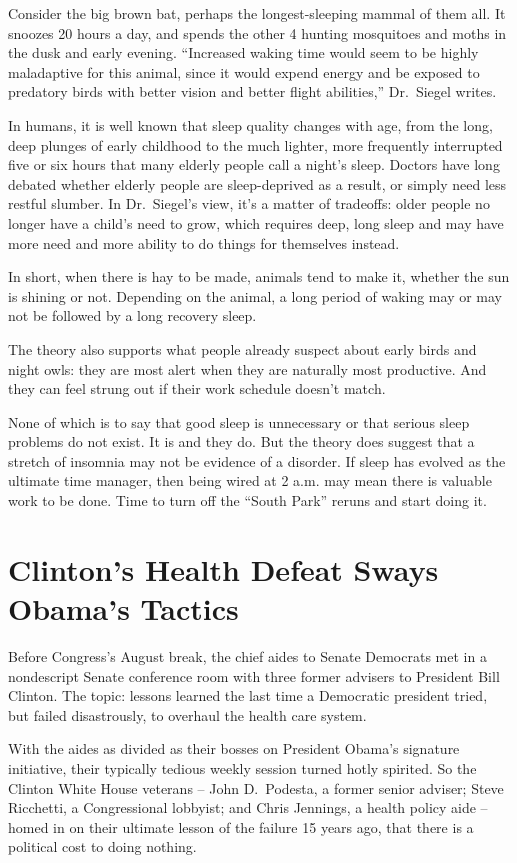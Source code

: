 ﻿\documentclass[12pt]{article}
\begin{document}
Consider the big brown bat, perhaps the longest-sleeping mammal of them all. It snoozes 20 hours a
day, and spends the other 4 hunting mosquitoes and moths in the dusk and early evening. ``Increased
waking time would seem to be highly maladaptive for this animal, since it would expend energy and be
exposed to predatory birds with better vision and better flight abilities,'' Dr.~Siegel writes.

In humans, it is well known that sleep quality changes with age, from the long, deep plunges of
early childhood to the much lighter, more frequently interrupted five or six hours that many elderly
people call a night's sleep. Doctors have long debated whether elderly people are sleep-deprived as
a result, or simply need less restful slumber\cite{slumber}. In Dr.~Siegel's view, it's a matter of
tradeoffs: older people no longer have a child's need to grow, which requires deep, long sleep and
may have more need and more ability to do things for themselves instead.

In short, when there is hay\cite{hay} to be made, animals tend to make it, whether the sun is
shining or not. Depending on the animal, a long period of waking may or may not be followed by a
long recovery sleep.

The theory also supports what people already suspect about early birds and night owls: they are most
alert when they are naturally most productive. And they can feel strung out if their work schedule
doesn't match.

None of which is to say that good sleep is unnecessary or that serious sleep problems do not exist.
It is and they do. But the theory does suggest that a stretch of insomnia may not be evidence of a
disorder. If sleep has evolved as the ultimate time manager, then being wired at 2 a.m. may mean
there is valuable work to be done. Time to turn off the ``South Park'' reruns and start doing it.

\section{Clinton's Health Defeat Sways\cite{sway} Obama's Tactics}

Before Congress's August break, the chief aides to Senate Democrats met in a nondescript Senate
conference room with three former advisers to President Bill Clinton. The topic: lessons learned the
last time a Democratic president tried, but failed disastrously, to overhaul the health care system.

With the aides as divided as their bosses on President Obama's signature initiative, their typically
tedious weekly session turned hotly spirited. So the Clinton White House veterans -- John
D.~Podesta, a former senior adviser; Steve Ricchetti, a Congressional lobbyist; and Chris Jennings,
a health policy aide -- homed in on their ultimate lesson of the failure 15 years ago, that there is
a political cost to doing nothing.
\end{document}
